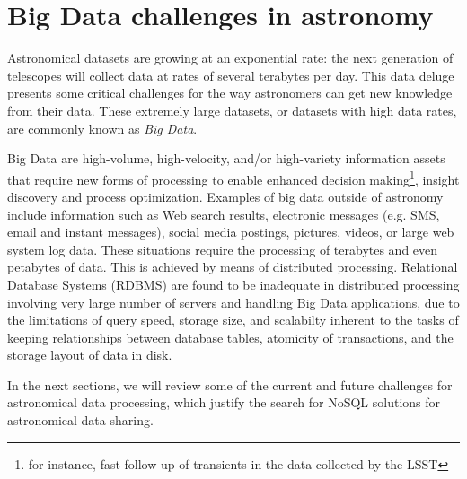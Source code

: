 \chapter{Big Data challenges in astronomy} %
\label{theproblem}

Astronomical datasets are growing at an exponential rate: the next generation of telescopes will collect data at rates of
several terabytes %
per day. This data
deluge %
presents some critical challenges for the way astronomers
can
get new knowledge from their data.
These extremely large datasets, or datasets with high data rates, are commonly known as
\emph{Big Data}.

Big Data are high-volume, high-velocity, and/or high-variety information assets that require new forms of processing to enable enhanced
decision making\footnote{for instance, fast follow up of transients in the data collected by the LSST}, %
insight discovery and process optimization. Examples of big data
outside of astronomy
include information such as Web search results, electronic messages (e.g. SMS, email and instant messages), social media postings, pictures, videos, 
or large web %
system log data.
These situations require the %
processing of terabytes and even petabytes of data. This is achieved by
means of
 distributed processing.
Relational Database Systems (RDBMS)
are found to be inadequate in distributed processing involving very large number of servers and handling Big Data applications, due to the limitations of query speed, storage size, and scalabilty inherent to the tasks of keeping relationships between database tables, atomicity of transactions, and the storage layout of data in disk.


In the next sections, we will review some of the current and future challenges for astronomical data processing, which justify the search for NoSQL solutions for astronomical data sharing.

